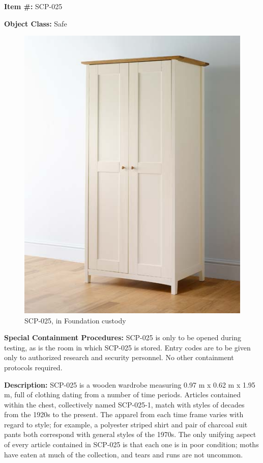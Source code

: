 
\textbf{Item \#:} SCP-025

\textbf{Object Class:} Safe

\begin{figure}[h]
\begin{center}
\includegraphics[scale=0.5]{scp/025.jpg}
\linebreak SCP-025, in Foundation custody
\end{center}
\end{figure}

\textbf{Special Containment Procedures:} SCP-025 is only to be opened during testing, as is the room in which SCP-025 is stored. Entry codes are to be given only to authorized research and security personnel. No other containment protocols required.

\textbf{Description:} SCP-025 is a wooden wardrobe measuring 0.97 m x 0.62 m x 1.95 m, full of clothing dating from a number of time periods. Articles contained within the chest, collectively named SCP-025-1, match with styles of decades from the 1920s to the present. The apparel from each time frame varies with regard to style; for example, a polyester striped shirt and pair of charcoal suit pants both correspond with general styles of the 1970s. The only unifying aspect of every article contained in SCP-025 is that each one is in poor condition; moths have eaten at much of the collection, and tears and runs are not uncommon.

